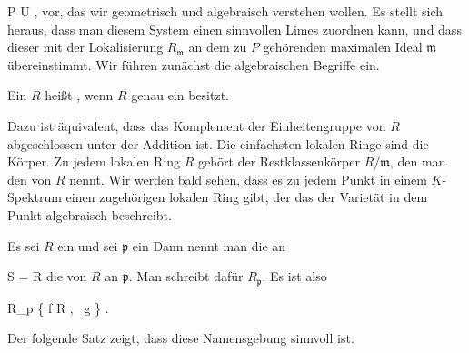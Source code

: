  {}
 {P \in U} {}
 {} {} {} {,}
vor, das wir geometrisch und algebraisch verstehen wollen. Es stellt sich heraus, dass man diesem System einen sinnvollen Limes
 {} {}
zuordnen kann, und dass dieser mit der Lokalisierung $R_{\mathfrak m}$ an dem zu $P$ gehörenden maximalen Ideal ${\mathfrak m}$ übereinstimmt. Wir führen zunächst die algebraischen Begriffe ein.


{}
{





Ein
$R$ heißt , wenn $R$ genau ein
besitzt.





}

Dazu ist äquivalent, dass das Komplement der Einheitengruppe von $R$ abgeschlossen unter der Addition ist. Die einfachsten lokalen Ringe sind die Körper. Zu jedem lokalen Ring $R$ gehört der Restklassenkörper $R/{\mathfrak m}$, den man den  {} von $R$ nennt. Wir werden bald sehen, dass es zu jedem Punkt in einem $K$-Spektrum einen zugehörigen lokalen Ring gibt, der das  der Varietät in dem Punkt algebraisch beschreibt.


{}
{





Es sei $R$ ein
und sei ${\mathfrak p}$ ein
Dann nennt man die
an

\mavergleichskette
{\vergleichskette
{S
}
{ = }{ R 
}
{  }{
}
{    }{
}
{   }{
}
}
{}{}{}
die  von $R$ an ${\mathfrak p}$. Man schreibt dafür $R_{\mathfrak p}$. Es ist also

\mavergleichskettedisp
{\vergleichskette
{ R_{\mathfrak p}
}
{ } {  \left\{   \mid  f \in R , \,  g \not{}       \right\}
}
{ } {
}
{ } {
}
{ } {
}
}
{}{}{.}





}

Der folgende Satz zeigt, dass diese Namensgebung sinnvoll ist.



